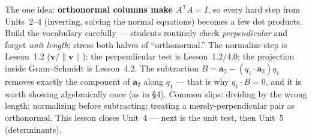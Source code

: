 \documentclass[10pt]{article}
\newcommand{\vv}{\mathbf{v}}
\newcommand{\avec}{\mathbf{a}}
\newcommand{\T}{\mathsf{T}}
\begin{document}
\begin{teachernote}
The one idea: \textbf{orthonormal columns make $A^{\T}A=I$}, so every hard step from Units~2--4 (inverting,
solving the normal equations) becomes a few dot products. Build the vocabulary carefully --- students
routinely check \emph{perpendicular} and forget \emph{unit length}; stress both halves of ``orthonormal.''
The normalize step is Lesson~1.2 ($\vv/\|\vv\|$); the perpendicular test is Lesson~1.2/4.0; the projection
inside Gram--Schmidt is Lesson~4.2. The subtraction $B=\avec_2-(q_1\cdot\avec_2)q_1$ removes exactly the
component of $\avec_2$ along $q_1$ --- that is why $q_1\cdot B=0$, and it is worth showing algebraically once
(as in \S4). Common slips: dividing by the wrong length; normalizing before subtracting; treating a
merely-perpendicular pair as orthonormal. This lesson closes Unit~4 --- next is the unit test, then Unit~5
(determinants).
\end{teachernote}
\end{document}
